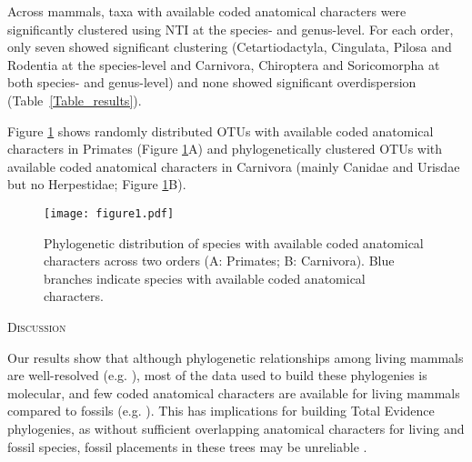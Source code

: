 \documentclass[12pt,letterpaper]{article}
\renewcommand{\section}[1]{%
\bigskip
\begin{center}
\begin{Large}
\normalfont\scshape #1
\medskip
\end{Large}
\end{center}}
\begin{document}




Across mammals, taxa with available coded anatomical characters were significantly clustered using NTI at the species- and genus-level.
For each order, only seven showed significant clustering (Cetartiodactyla, Cingulata, Pilosa and Rodentia at the species-level and Carnivora, Chiroptera and Soricomorpha at both species- and genus-level) and none showed significant overdispersion (Table~\ref{Table_results}).

Figure \ref{Figure_example_coverage} shows randomly distributed OTUs with available coded anatomical characters in Primates (Figure \ref{Figure_example_coverage}A) and phylogenetically clustered OTUs with available coded anatomical characters in Carnivora (mainly Canidae and Urisdae but no Herpestidae; Figure \ref{Figure_example_coverage}B).

\begin{figure}[!htbp]
\centering
   \texttt{[image: figure1.pdf]}
\caption{Phylogenetic distribution of species with available coded anatomical characters across two orders (A: Primates; B: Carnivora).
Blue branches indicate species with available coded anatomical characters.}
\label{Figure_example_coverage}
\end{figure}

%
%

\section{Discussion}
Our results show that although phylogenetic relationships among living mammals are well-resolved (e.g. \cite{BinindaEmonds,meredithimpacts2011}), most of the data used to build these phylogenies is molecular, and few coded anatomical characters are available for living mammals compared to fossils (e.g. \cite{O'Leary08022013,ni2013oldest}).
This has implications for building Total Evidence phylogenies, as without sufficient overlapping anatomical characters for living and fossil species, fossil placements in these trees may be unreliable \cite{GuillermeCooper}. 
\end{document}
